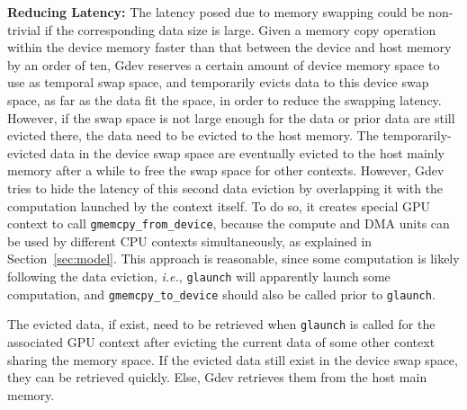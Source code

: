 \textbf{Reducing Latency:}
The latency posed due to memory swapping could be non-trivial if the
corresponding data size is large.
Given a memory copy operation within the device memory faster than
that between the device and host memory by an order of ten, Gdev
reserves a certain amount of device memory space to use as temporal swap
space, and temporarily evicts data to this device swap space, as far as
the data fit the space, in order to reduce the swapping latency.
However, if the swap space is not large enough for the data or prior
data are still evicted there, the data need to be evicted to the host
memory.
The temporarily-evicted data in the device swap space are eventually
evicted to the host mainly memory after a while to free the swap space
for other contexts.
However, Gdev tries to hide the latency of this second data eviction by
overlapping it with the computation launched by the context itself.
To do so, it creates special GPU context to call
\texttt{gmemcpy\_from\_device}, because the compute and DMA units can be
used by different CPU contexts simultaneously, as explained in
Section~\ref{sec:model}.
This approach is reasonable, since some computation is likely following
the data eviction, \textit{i.e.}, \texttt{glaunch} will apparently
launch some computation, and \texttt{gmemcpy\_to\_device} should also be
called prior to \texttt{glaunch}.

The evicted data, if exist, need to be retrieved when \texttt{glaunch}
is called for the associated GPU context after evicting the current data
of some other context sharing the memory space.
If the evicted data still exist in the device swap space, they can be
retrieved quickly.
Else, Gdev retrieves them from the host main memory.
